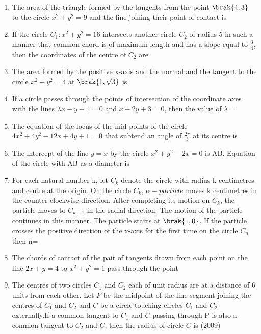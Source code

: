 \begin{enumerate}
%
	\hfill{}
\item The area of the triangle formed by the tangents from the point $\brak{4, 3}$ to the circle $x^{2}+y^{2}=9$ and the line joining their point of contact is
%
	\hfill{}
\item If the circle $C_1:x^{2}+y^{2}=16$ intersects another circle $C_2$ of radius 5 in such a manner that common chord is of maximum length and has a slope equal to $\frac{3}{4}$,  then the coordinates of the centre of $C_2$ are
%
	\hfill{}
\item The area formed by the positive x-axis and the normal and the tangent to the circle $x^{2}+y^{2}=4$ at $\brak{1, \sqrt{3}}$ is
%
	\hfill{}
\item If a circle passes through the points of intersection of the coordinate axes with the lines $\lambda x-y+1=0$ and $x-2y+3=0$,  then the value of $\lambda =$
%
	\hfill{}
\item The equation of the locus of the mid-points of the circle $4x^{2}+4y^{2}-12x+4y+1=0$ that subtend an angle of $\frac{2\pi}{3}$ at its centre is
%
	\hfill{}
\item The intercept of the line $y=x$ by the circle $x^{2}+y^{2}-2x=0$ is AB. Equation of the circle with AB as a diameter is
%
	\hfill{}
\item For each natural number k,  let $C_k$ denote the circle with radius k centimetres and centre at the origin. On the circle $C_k$,  $\alpha-particle$ moves k centimetres in the counter-clockwise direction. After completing its motion on $C_k$,  the particle moves to $C_{k+1}$ in the radial direction. The motion of the particle continues in this manner. The particle starts at $\brak{1, 0}$. If the particle crosses the positive direction of the x-axis for the first time on the circle $C_n$ \\then n=
%
	\hfill{}
\item The chords of contact of the pair of tangents drawn from each point on the line $2x+y=4$ to $x^{2}+y^{2}=1$ pass through the point
%
	\hfill{}
\item The centres of two circles $C_1$ and $C_2$ each of unit radius are at a distance of $6$ units from each other. Let $P$ be the midpoint of the line segment joining the centres of $C_1$ and $C_2$ and $C$ be a circle touching circles $C_1$ and $C_2$ externally.If a common tangent to $C_1$ and $C$ passing through P is also a common tangent to $C_2$ and $C$,  then the radius of circle $C$ is \hfill(2009)

\end{enumerate}
